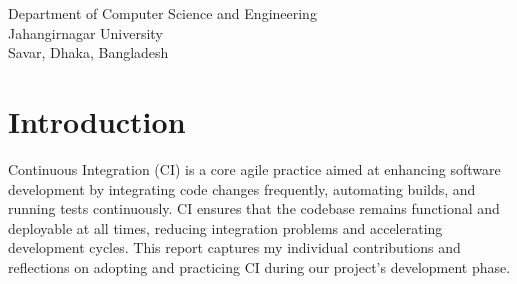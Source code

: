 \documentclass[a4paper,12pt]{article}
\begin{document}
\begin{center}
\begin{table}[h!]
\begin{tabular}{|c|c|c|c|}
        \end{tabular}
    \end{table}

    \vspace{1cm}

    Department of Computer Science and Engineering\\
    Jahangirnagar University\\
    Savar, Dhaka, Bangladesh\\
\end{center}

\newpage

\tableofcontents

\newpage
\pagestyle{fancy}
\fancyhf{}
\fancyfoot[C]{\thepage} %
\section{Introduction}
Continuous Integration (CI) is a core agile practice aimed at enhancing software development by integrating
code changes frequently, automating builds, and running tests continuously. CI ensures that the codebase
remains functional and deployable at all times, reducing integration problems and accelerating development
cycles. This report captures my individual contributions and reflections on adopting and practicing CI during
our project’s development phase.
\end{document}
